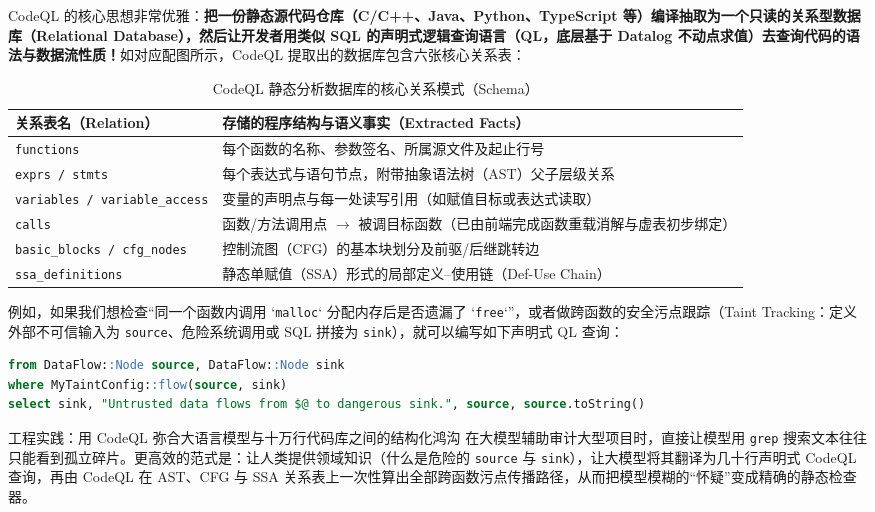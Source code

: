 \documentclass[a4paper]{article}
\begin{document}
CodeQL 的核心思想非常优雅：\textbf{把一份静态源代码仓库（C/C++、Java、Python、TypeScript 等）编译抽取为一个只读的关系型数据库（Relational Database），然后让开发者用类似 SQL 的声明式逻辑查询语言（QL，底层基于 Datalog 不动点求值）去查询代码的语法与数据流性质！}如对应配图所示，CodeQL 提取出的数据库包含六张核心关系表：
\begin{table}[H]
\centering
\caption{CodeQL 静态分析数据库的核心关系模式（Schema）}
\label{tab:codeql_schema}
\begin{tabular}{p{3.5cm}p{9.8cm}}
\toprule
\textbf{关系表名（Relation）} & \textbf{存储的程序结构与语义事实（Extracted Facts）} \\
\midrule
\texttt{functions} & 每个函数的名称、参数签名、所属源文件及起止行号 \\
\texttt{exprs / stmts} & 每个表达式与语句节点，附带抽象语法树（AST）父子层级关系 \\
\texttt{variables / variable\_access} & 变量的声明点与每一处读写引用（如赋值目标或表达式读取） \\
\texttt{calls} & 函数/方法调用点 $\to$ 被调目标函数（已由前端完成函数重载消解与虚表初步绑定） \\
\texttt{basic\_blocks / cfg\_nodes} & 控制流图（CFG）的基本块划分及前驱/后继跳转边 \\
\texttt{ssa\_definitions} & 静态单赋值（SSA）形式的局部定义--使用链（Def-Use Chain） \\
\bottomrule
\end{tabular}
\end{table}

例如，如果我们想检查“同一个函数内调用 `\texttt{malloc}` 分配内存后是否遗漏了 `\texttt{free}`”，或者做跨函数的安全污点跟踪（Taint Tracking：定义外部不可信输入为 \texttt{source}、危险系统调用或 SQL 拼接为 \texttt{sink}），就可以编写如下声明式 QL 查询：
\begin{lstlisting}[language=SQL, caption={CodeQL 污点分析与规则查询概念结构}]
from DataFlow::Node source, DataFlow::Node sink
where MyTaintConfig::flow(source, sink)
select sink, "Untrusted data flows from $@ to dangerous sink.", source, source.toString()
\end{lstlisting}
\begin{practicebox}{工程实践：用 CodeQL 弥合大语言模型与十万行代码库之间的结构化鸿沟}
在大模型辅助审计大型项目时，直接让模型用 \texttt{grep} 搜索文本往往只能看到孤立碎片。更高效的范式是：让人类提供领域知识（什么是危险的 \texttt{source} 与 \texttt{sink}），让大模型将其翻译为几十行声明式 CodeQL 查询，再由 CodeQL 在 AST、CFG 与 SSA 关系表上一次性算出全部跨函数污点传播路径，从而把模型模糊的“怀疑”变成精确的静态检查器。
\end{practicebox}
\end{document}
